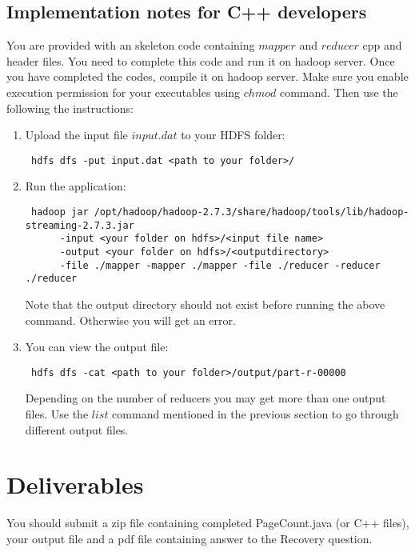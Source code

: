 \documentclass[11pt]{article}
\begin{document}
\subsection*{Implementation notes for C++ developers}
You are provided with an skeleton code containing $mapper$ and $reducer$ cpp and header files. You need to complete this code and run it on hadoop server. Once you have completed the codes, compile it on hadoop server. Make sure you enable execution permission for your executables using $chmod$ command. Then use the following the instructions:
\begin{enumerate}
\item Upload the input file $input.dat$ to your HDFS folder:
\begin{verbatim}
 hdfs dfs -put input.dat <path to your folder>/
\end{verbatim}
\item Run the application:
\begin{verbatim}
 hadoop jar /opt/hadoop/hadoop-2.7.3/share/hadoop/tools/lib/hadoop-streaming-2.7.3.jar 
	  -input <your folder on hdfs>/<input file name> 
	  -output <your folder on hdfs>/<outputdirectory> 
	  -file ./mapper -mapper ./mapper -file ./reducer -reducer ./reducer
\end{verbatim}
Note that the output directory should not exist before running the above command. Otherwise you will get an error. 
\item You can view the output file:
\begin{verbatim}
 hdfs dfs -cat <path to your folder>/output/part-r-00000
\end{verbatim}
Depending on the number of reducers you may get more than one output files. Use the $list$ command mentioned in the previous section to go through different output files.
\end{enumerate}


\section*{Deliverables}
You should submit a zip file containing completed PageCount.java (or C++ files), your output file and a pdf file containing answer to the Recovery question.
\end{document}
